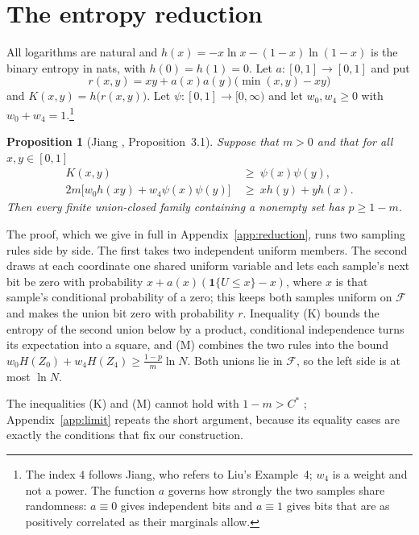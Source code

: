 \documentclass[aps,prd,twocolumn,superscriptaddress,nofootinbib,longbibliography,floatfix,amsmath,amssymb,10pt]{revtex4-2}
\theoremstyle{plain}
\newtheorem{proposition}[theorem]{Proposition}
\theoremstyle{definition}
\theoremstyle{plain}
\newcommand{\cF}{\mathcal{F}}
\newcommand{\Cs}{C^{*}}
\begin{document}
\section{The entropy reduction}\label{sec:reduction}

All logarithms are natural and $h(x)=-x\ln x-(1-x)\ln(1-x)$ is the binary entropy in nats, with $h(0)=h(1)=0$. Let $a:[0,1]\to[0,1]$ and put
\begin{equation}\label{eq:r}
r(x,y)=xy+a(x)a(y)\bigl(\min(x,y)-xy\bigr)
\end{equation}
and $K(x,y)=h\bigl(r(x,y)\bigr)$.
Let $\psi:[0,1]\to[0,\infty)$ and let $w_0,w_4\ge 0$ with $w_0+w_4=1$.\footnote{The index $4$ follows Jiang, who refers to Liu's Example~4; $w_4$ is a weight and not a power. The function $a$ governs how strongly the two samples share randomness: $a\equiv 0$ gives independent bits and $a\equiv 1$ gives bits that are as positively correlated as their marginals allow.}

\begin{proposition}[Jiang \cite{Jia26}, Proposition~3.1]\label{prop:reduction}
Suppose that $m>0$ and that for all $x,y\in[0,1]$
\begin{align}
K(x,y)&\ \ge\ \psi(x)\psi(y), \tag{K}\label{eq:K}\\
2m\bigl[w_0h(xy)+w_4\psi(x)\psi(y)\bigr]&\ \ge\ xh(y)+yh(x). \tag{M}\label{eq:M}
\end{align}
Then every finite union-closed family containing a nonempty set has $p\ge 1-m$.
\end{proposition}

The proof, which we give in full in Appendix~\ref{app:reduction}, runs two sampling rules side by side. The first takes two independent uniform members. The second draws at each coordinate one shared uniform variable and lets each sample's next bit be zero with probability $x+a(x)(\mathbf 1\{U\le x\}-x)$, where $x$ is that sample's conditional probability of a zero; this keeps both samples uniform on $\cF$ and makes the union bit zero with probability $r$. Inequality (K) bounds the entropy of the second union below by a product, conditional independence turns its expectation into a square, and (M) combines the two rules into the bound $w_0H(Z_0)+w_4H(Z_4)\ge \frac{1-p}{m}\ln N$. Both unions lie in $\cF$, so the left side is at most $\ln N$.

The inequalities (K) and (M) cannot hold with $1-m>\Cs$ \cite[Proposition~4.1]{Jia26}; Appendix~\ref{app:limit} repeats the short argument, because its equality cases are exactly the conditions that fix our construction.
\end{document}
